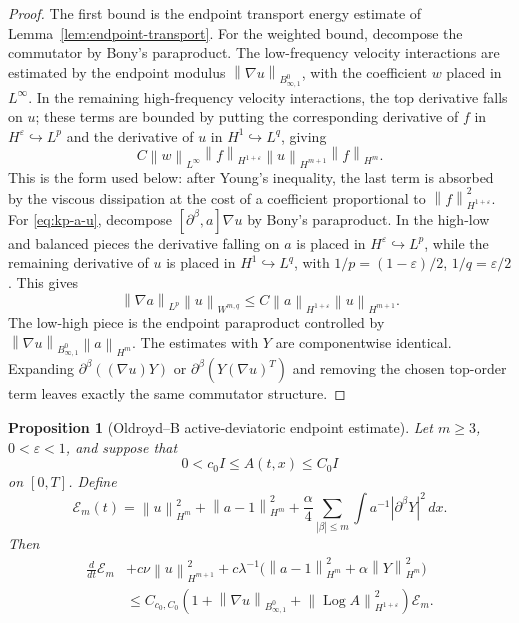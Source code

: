 \documentclass[11pt]{article}
\newtheorem{proposition}{Proposition}[section]
\newcommand{\Log}{\operatorname{Log}}
\newcommand{\calE}{\mathcal E}
\newcommand{\eps}{\varepsilon}
\newcommand{\norm}[1]{\left\lVert #1\right\rVert}
\newcommand{\Besov}{B^0_{\infty,1}}
\begin{document}
\begin{proof}
The first bound is the endpoint transport energy estimate of
Lemma~\ref{lem:endpoint-transport}.  For the weighted bound, decompose the
commutator by Bony's paraproduct.  The low-frequency velocity interactions are
estimated by the endpoint modulus
\(\norm{\nabla u}_{B^0_{\infty,1}}\), with the coefficient \(w\) placed in
\(L^\infty\).  In the remaining high-frequency velocity interactions, the
top derivative falls on \(u\); these terms are bounded by putting the
corresponding derivative of \(f\) in \(H^\eps\hookrightarrow L^p\) and the
derivative of \(u\) in \(H^1\hookrightarrow L^q\), giving
\[
  C\norm{w}_{L^\infty}\norm{f}_{H^{1+\eps}}
  \norm{u}_{H^{m+1}}\norm{f}_{H^m}.
\]
This is the form used below: after Young's inequality, the last term is
absorbed by the viscous dissipation at the cost of a coefficient proportional
to \(\norm{f}_{H^{1+\eps}}^2\).
For \eqref{eq:kp-a-u}, decompose
\([\partial^\beta,a]\nabla u\) by Bony's paraproduct.  In the high-low and
balanced pieces the derivative falling on \(a\) is placed in
\(H^\eps\hookrightarrow L^p\), while the remaining derivative of \(u\) is
placed in \(H^1\hookrightarrow L^q\), with
\(1/p=(1-\eps)/2\), \(1/q=\eps/2\).  This gives
\[
  \norm{\nabla a}_{L^p}\norm{u}_{W^{m,q}}
  \le C\norm{a}_{H^{1+\eps}}\norm{u}_{H^{m+1}}.
\]
The low-high piece is the endpoint paraproduct controlled by
\(\norm{\nabla u}_{B^0_{\infty,1}}\norm{a}_{H^m}\).  The estimates with \(Y\)
are componentwise identical.  Expanding
\(\partial^\beta((\nabla u)Y)\) or
\(\partial^\beta(Y(\nabla u)^T)\) and removing the chosen top-order term leaves
exactly the same commutator structure.
\end{proof}

\begin{proposition}[Oldroyd--B active-deviatoric endpoint estimate]
\label{prop:physical-L2-estimate}
Let \(m\ge3\), \(0<\eps<1\), and suppose that
\[
  0<c_0I\le A(t,x)\le C_0I
\]
on \([0,T]\).  Define
\[
  \calE_m(t)=\norm{u}_{H^m}^2+\norm{a-1}_{H^m}^2
  +\frac{\alpha}{4}\sum_{|\beta|\le m}\int a^{-1}|\partial^\beta Y|^2\,dx .
\]
Then
\[
\begin{aligned}
  \frac{d}{dt}\calE_m
  &+c\nu\norm{u}_{H^{m+1}}^2
   +c\lambda^{-1}\bigl(\norm{a-1}_{H^m}^2+\alpha\norm{Y}_{H^m}^2\bigr) \\
  &\le
  C_{c_0,C_0}\left(1+\norm{\nabla u}_{\Besov}
  +\norm{\Log A}_{H^{1+\eps}}^2\right)\calE_m .
\end{aligned}
\label{eq:physical-L2-energy}
\]
\end{proposition}
\end{document}
